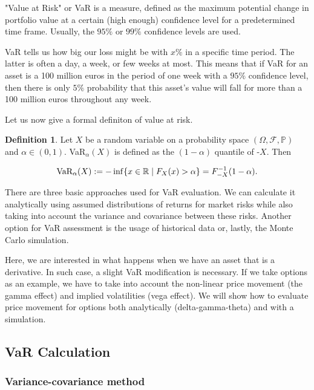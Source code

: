 \documentclass[a4paper, 12pt]{article}
\theoremstyle{definition}
\theoremstyle{plain}
\theoremstyle{definition}
\newtheorem{definition}{Definition}[section]
\newcommand{\R}{\mathbb R}
\newcommand{\f}{\mathcal F}
\newcommand{\p}{\mathbb P}
\begin{document}
"Value at Risk" or VaR is a measure, defined as the maximum potential change in portfolio value 
at a certain (high enough) confidence level for a predetermined time frame.
Usually, the $95\%$ or $99\%$ confidence levels are used.

VaR tells us how big our loss might be with $x\%$ in a specific time period.
The latter is often a day, a week, or few weeks at most.
This means that if VaR for an asset is a 100 million euros in the period of one week 
with a $95\%$ confidence level, then there is only $5\%$ probability that this asset's value 
will fall for more than a 100 million euros throughout any week.

Let us now give a formal definiton of value at risk. 
\begin{definition}
Let $X$ be a random variable on a probability space $(\Omega, \f, \p)$ and $\alpha \in (0, 1)$.
VaR$_\alpha(X)$ is defined as the $(1-\alpha)$ quantile of -$X$. Then

\begin{equation}\label{var}
    \textnormal{VaR}_\alpha(X) := - \inf \{ x \in \R \mid F_X(x) > \alpha \} = F^{-1}_{-X}(1-\alpha).
\end{equation}
\end{definition}

There are three basic approaches used for VaR evaluation. We can calculate it 
analytically using assumed distributions of returns for market risks while also 
taking into account the variance and covariance between these risks. 
Another option for VaR assessment is the usage of historical data or, lastly, 
the Monte Carlo simulation.

Here, we are interested in what happens when we have an asset that is a derivative.
In such case, a slight VaR modification is necessary.
If we take options as an example, we have to take into account the non-linear price movement 
(the gamma effect) and implied volatilities (vega effect).
We will show how to evaluate price movement for options both analytically (delta-gamma-theta)
and with a simulation.

\subsection{VaR Calculation}

\subsubsection{Variance-covariance method}
\end{document}
